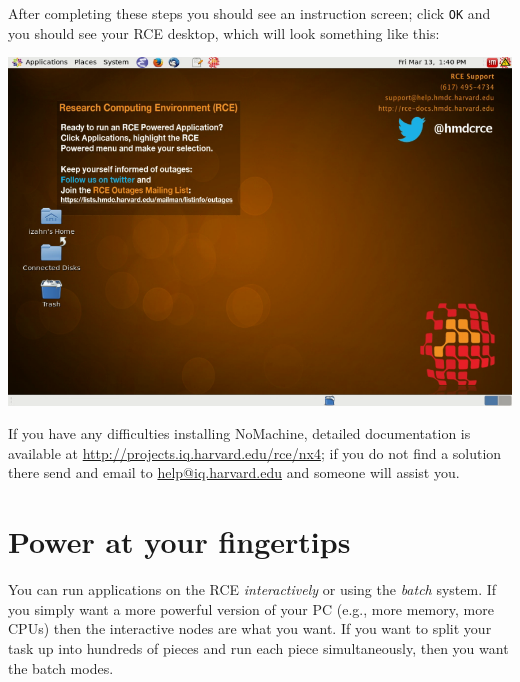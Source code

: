 \documentclass[11pt]{article}
\begin{document}
After completing these steps you should see an instruction screen; click \texttt{OK} and you should see your RCE desktop, which will look something like this:

\begin{center}
\includegraphics[width=.9\linewidth]{images/rceDesktop.png}
\end{center}

If you have any difficulties installing NoMachine, detailed documentation is available at \url{http://projects.iq.harvard.edu/rce/nx4}; if you do not find a solution there send and email to \href{mailto:help@iq.harvard.edu}{help@iq.harvard.edu} and someone will assist you.

\section{Power at your fingertips}
\label{sec:org85e2aa8}

You can run applications on the RCE \emph{interactively} or using the \emph{batch} system. If you simply want a more powerful version of your PC (e.g., more memory, more CPUs) then the interactive nodes are what you want. If you want to split your task up into hundreds of pieces and run each piece simultaneously, then you want the batch modes.
\end{document}
